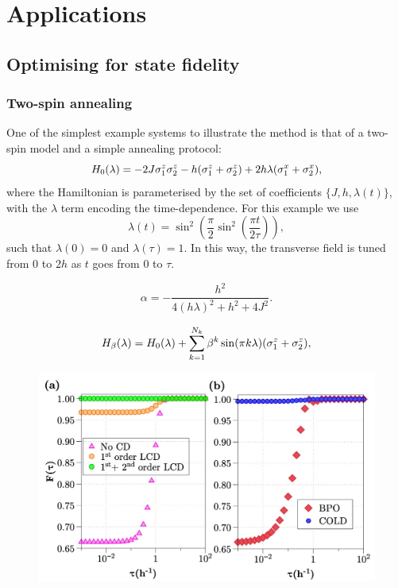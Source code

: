 \part{Applications}

\chapter{Optimising for state fidelity}\label{chap:5_Applications_fidelity}

\section{Two-spin annealing}\label{sec:5.1_2spin_annealing}

One of the simplest example systems to illustrate the  method is that of a two-spin model and a simple annealing protocol:
\begin{equation}\label{eq:two_spin_hamiltonian}
H_0(\lambda) = -2J \sigma^z_1 \sigma^z_2 - h ( \sigma^z_{1} + \sigma^z_{2}) +  2h \lambda (\sigma^x_{1} + \sigma^x_{2}),
\end{equation}
where the Hamiltonian is parameterised by the set of coefficients $\{J, h, \lambda(t)\}$, with the $\lambda$ term encoding the time-dependence. For this example we use
\begin{equation}\label{eq:lambda_func1}
\lambda(t) = \sin^2\left(\frac{\pi}{2} \sin^2 \left( \frac{\pi t}{2 \tau} \right) \right),
\end{equation}
such that $\lambda(0) = 0$ and $\lambda(\tau) = 1$. In this way, the transverse field is tuned from $0$ to $2h$ as $t$ goes from $0$ to $\tau$.

\begin{equation}\label{eq:two_spin_alpha}
\alpha = - \frac{h^2}{4(h\lambda)^2 + h^2 + 4J^2}.
\end{equation}

\begin{equation}\label{eq:H_optimal_control}
H_\beta(\lambda) = H_0(\lambda) + \sum_{k=1}^{N_k} \beta^k \sin (\pi k \lambda) ( \sigma^z_{1} + \sigma^z_{2}),
\end{equation}

\begin{figure}[t]
    \centering
    \includegraphics[width=0.9\linewidth]{images/twospins_fidelities.jpg} \caption[COLD applied to two-spin annealing]{}\label{fig:twospin_fidelities}
    \end{figure}

